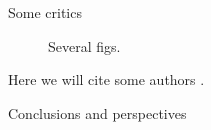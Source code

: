 \begin{frame}[t]
\begin{columns}[t]
\begin{column}{\colwidth}
\begin{block}{Some critics}
				\begin{figure}[hbtp]
					\caption{%
						Several figs.
					}
				\end{figure}
				Here we will cite some authors \cite{westfahl:space,set,stdmodel}.
			\end{block}

			\begin{block}{Conclusions and perspectives}
				\lipsum[5-6]
			\end{block}

			\printbibliography
		\end{column}
		\separatorcolumn
	\end{columns}
\end{frame}


